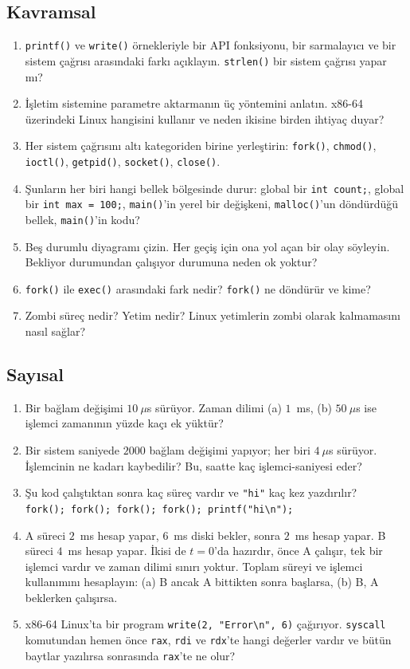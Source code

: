 \documentclass[11pt,a4paper]{article}
\newcommand{\cmd}[1]{\texttt{#1}}
\begin{document}
\subsection*{Kavramsal}
\begin{enumerate}[leftmargin=1.6em]
  \item \cmd{printf()} ve \cmd{write()} örnekleriyle bir API fonksiyonu, bir sarmalayıcı ve bir sistem çağrısı arasındaki farkı açıklayın. \cmd{strlen()} bir sistem çağrısı yapar mı?
  \item İşletim sistemine parametre aktarmanın üç yöntemini anlatın. x86-64 üzerindeki Linux hangisini kullanır ve neden ikisine birden ihtiyaç duyar?
  \item Her sistem çağrısını altı kategoriden birine yerleştirin: \cmd{fork()}, \cmd{chmod()}, \cmd{ioctl()}, \cmd{getpid()}, \cmd{socket()}, \cmd{close()}.
  \item Şunların her biri hangi bellek bölgesinde durur: global bir \texttt{int count;}, global bir \texttt{int max = 100;}, \cmd{main()}'in yerel bir değişkeni, \cmd{malloc()}'un döndürdüğü bellek, \cmd{main()}'in kodu?
  \item Beş durumlu diyagramı çizin. Her geçiş için ona yol açan bir olay söyleyin. Bekliyor durumundan çalışıyor durumuna neden ok yoktur?
  \item \cmd{fork()} ile \cmd{exec()} arasındaki fark nedir? \cmd{fork()} ne döndürür ve kime?
  \item Zombi süreç nedir? Yetim nedir? Linux yetimlerin zombi olarak kalmamasını nasıl sağlar?
\end{enumerate}

\subsection*{Sayısal}
\begin{enumerate}[leftmargin=1.6em,resume]
  \item Bir bağlam değişimi $10\ \mu$s sürüyor. Zaman dilimi (a) $1$~ms, (b) $50\ \mu$s ise işlemci zamanının yüzde kaçı ek yüktür?
  \item Bir sistem saniyede $2000$ bağlam değişimi yapıyor; her biri $4\ \mu$s sürüyor. İşlemcinin ne kadarı kaybedilir? Bu, saatte kaç işlemci-saniyesi eder?
  \item Şu kod çalıştıktan sonra kaç süreç vardır ve \texttt{"hi"} kaç kez yazdırılır?\\ \texttt{fork(); fork(); fork(); fork(); printf("hi\textbackslash n");}
  \item A süreci $2$~ms hesap yapar, $6$~ms diski bekler, sonra $2$~ms hesap yapar. B süreci $4$~ms hesap yapar. İkisi de $t = 0$'da hazırdır, önce A çalışır, tek bir işlemci vardır ve zaman dilimi sınırı yoktur. Toplam süreyi ve işlemci kullanımını hesaplayın: (a) B ancak A bittikten sonra başlarsa, (b) B, A beklerken çalışırsa.
  \item x86-64 Linux'ta bir program \cmd{write(2, "Error\textbackslash n", 6)} çağırıyor. \texttt{syscall} komutundan hemen önce \texttt{rax}, \texttt{rdi} ve \texttt{rdx}'te hangi değerler vardır ve bütün baytlar yazılırsa sonrasında \texttt{rax}'te ne olur?
\end{enumerate}
\end{document}
